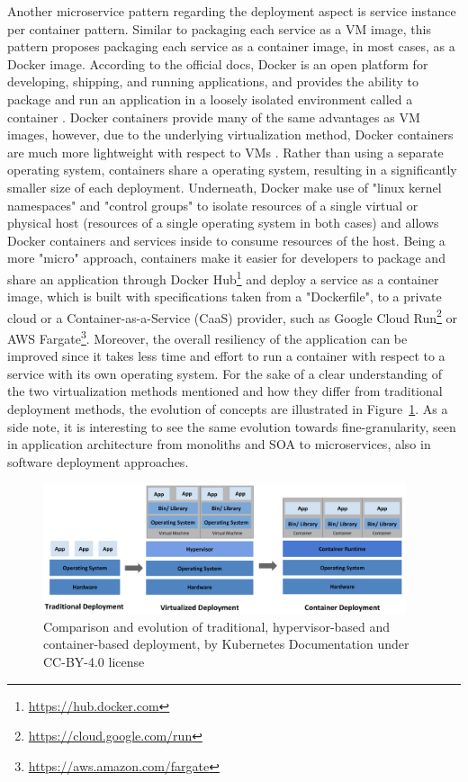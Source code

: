 \documentclass{Configuration_Files/PoliMi3i_thesis}
\begin{document}
Another microservice pattern regarding the deployment aspect is service instance per container pattern.
Similar to packaging each service as a VM image, this pattern proposes packaging each service as a container image, in most cases, as a Docker image.
According to the official docs, Docker is an open platform for developing, shipping, and running applications, and provides the ability to package and run an application in a loosely isolated environment called a container \cite{docker_def}.
Docker containers provide many of the same advantages as VM images, however, due to the underlying virtualization method, Docker containers are much more lightweight with respect to VMs \cite{eder2016hypervisor}.
Rather than using a separate operating system, containers share a operating system, resulting in a significantly smaller size of each deployment.
Underneath, Docker make use of "linux kernel namespaces" and "control groups" to isolate resources of a single virtual or physical host (resources of a single operating system in both cases) and allows Docker containers and services inside to consume resources of the host.
Being a more "micro" approach, containers make it easier for developers to package and share an application through Docker Hub\footnote{\href{https://hub.docker.com}{https://hub.docker.com}} and deploy a service as a container image, which is built with specifications taken from a "Dockerfile", to a private cloud or a Container-as-a-Service (CaaS) provider, such as Google Cloud Run\footnote{\href{https://cloud.google.com/run}{https://cloud.google.com/run}} or AWS Fargate\footnote{\href{https://aws.amazon.com/fargate}{https://aws.amazon.com/fargate}}.
Moreover, the overall resiliency of the application can be improved since it takes less time and effort to run a container with respect to a service with its own operating system.
For the sake of a clear understanding of the two virtualization methods mentioned and how they differ from traditional deployment methods, the evolution of concepts are illustrated in Figure~\ref{fig:hypervisor_vs_container}. As a side note, it is interesting to see the same evolution towards fine-granularity, seen in application architecture from monoliths and SOA to microservices, also in software deployment approaches.

\begin{figure}[H]
\centering
\includegraphics[width=0.95\textwidth]{myImages/kubernetes_evo.png}
\caption{Comparison and evolution of traditional, hypervisor-based and container-based deployment, by Kubernetes Documentation under CC-BY-4.0 license}
\label{fig:hypervisor_vs_container}
\end{figure}
\end{document}
